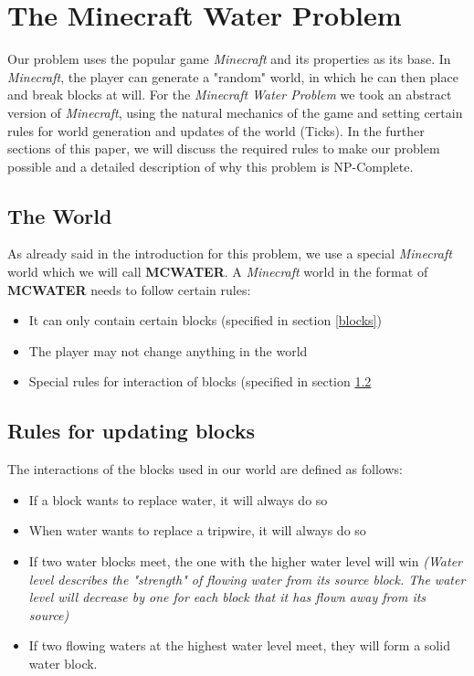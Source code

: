 \section{The Minecraft Water Problem}
\noindent Our problem uses the popular game \textit{Minecraft} and its properties as its base. In \textit{Minecraft}, the player can generate a "random" world, in which he can then place and break blocks at will. For the \textit{Minecraft Water Problem} we took an abstract version of \textit{Minecraft}, using the natural mechanics of the game and setting certain rules for world generation and updates of the world (Ticks). In the further sections of this paper, we will discuss the required rules to make our problem possible and a detailed description of why this problem is NP-Complete.

\subsection{The World} 

\noindent As already said in the introduction for this problem, we use a special \textit{Minecraft} world which we will call \textbf{MCWATER}. A \textit{Minecraft} world in the format of \textbf{MCWATER} needs to follow certain rules:

\begin{itemize}
    \item It can only contain certain blocks (specified in section \ref{blocks})
    \item The player may not change anything in the world
    \item Special rules for interaction of blocks (specified in section \ref{rules}
\end{itemize}

\subsection{Rules for updating blocks} \label{rules}
\noindent The interactions of the blocks used in our world are defined as follows:

\begin{itemize}
    \item If a block wants to replace water, it will always do so
    \item When water wants to replace a tripwire, it will always do so
    \item If two water blocks meet, the one with the higher water level will win \textit{(Water level describes the "strength" of flowing water from its source block. The water level will decrease by one for each block that it has flown away from its source)}
    \item If two flowing waters at the highest water level meet, they will form a solid water block.
\end{itemize}

